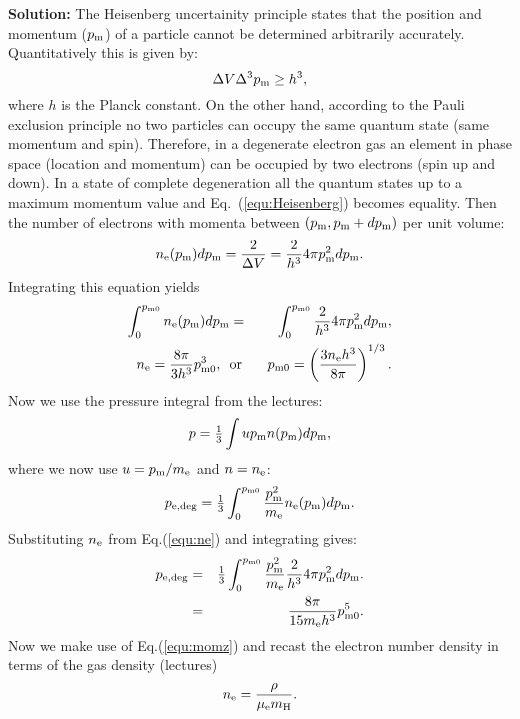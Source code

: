 \documentclass[12pt]{article}
\def\mue{\mu_{\rm e}}
\def\pmom{p_{\rm m}}
\def\pedeg{p_{\rm e,deg}}
\def\pmomz{p_{\rm m0}}
\def\onethird{{\textstyle{1\over3}}}
\begin{document}
{\bf Solution:} The Heisenberg uncertainity principle states that the
position and momentum ($\pmom$) of a particle cannot be determined
arbitrarily accurately. Quantitatively this is given by:
\begin{equation}
\Delta V \Delta^3 \pmom \geq h^3,\label{equ:Heisenberg}
\end{equation}
where $h$ is the Planck constant. On the other hand, according to the
Pauli exclusion principle no two particles can occupy the same quantum
state (same momentum and spin). Therefore, in a degenerate electron
gas an element in phase space (location and momentum) can be occupied
by two electrons (spin up and down). In a state of complete
degeneration all the quantum states up to a maximum momentum value and
Eq.~(\ref{equ:Heisenberg}) becomes equality. Then the number of
electrons with momenta between $(\pmom,\pmom+d\pmom)$ per unit volume:
\begin{equation}
n_{\rm e}(\pmom)d\pmom = \frac{2}{\Delta V} = \frac{2}{h^3} 4\pi \pmom^2 d\pmom.\label{equ:ne}
\end{equation}
Integrating this equation yields
\begin{eqnarray}
\int_0^{\pmomz} n_{\rm e}(\pmom)d\pmom &=& \int_0^{\pmomz} \frac{2}{h^3} 4\pi \pmom^2 d\pmom,\\
n_{\rm e} = \frac{8\pi}{3 h^3} \pmomz^3,\ \ &\mbox{or}& \ \ \pmomz = \left( \frac{3n_{\rm e}h^3}{8\pi} \right)^{1/3}.\label{equ:momz}
\end{eqnarray}
Now we use the pressure integral from the lectures:
\begin{eqnarray}
p = \onethird \int u \pmom n(\pmom) d\pmom,\label{equ:pintegral}
\end{eqnarray}
where we now use $u = \pmom/m_{\rm e}$ and $n = n_{\rm e}$:
\begin{eqnarray}
\pedeg = \onethird \int_0^{\pmomz} \frac{\pmom^2}{m_{\rm e}} n_{\rm e}(\pmom) d\pmom.
\end{eqnarray}
Substituting $n_{\rm e}$ from Eq.(\ref{equ:ne}) and integrating gives:
\begin{eqnarray}
\pedeg &=& \onethird \int_0^{\pmomz} \frac{\pmom^2}{m_{\rm e}} \frac{2}{h^3} 4\pi \pmom^2 d\pmom.\\
       &=& \frac{8\pi}{15 m_{\rm e} h^3} \pmomz^5.\label{equ:pp1}
\end{eqnarray}
Now we make use of Eq.(\ref{equ:momz}) and recast the electron number
density in terms of the gas density (lectures)
\begin{equation}
n_{\rm e} = \frac{\rho}{\mue m_{\rm H}}.\label{equ:ne2}
\end{equation}
\end{document}
